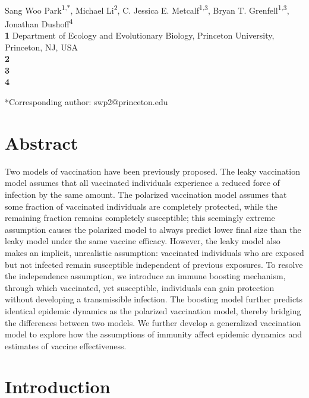 \documentclass[12pt]{article}
\date{\today}
\begin{document}
\begin{flushleft}{
	\Large
	\textbf{}
}
\newline
\\
Sang Woo Park\textsuperscript{1,*}, Michael Li\textsuperscript{2}, C. Jessica E. Metcalf\textsuperscript{1,3}, Bryan T. Grenfell\textsuperscript{1,3}, Jonathan Dushoff\textsuperscript{4}
\\
\bigskip
\textbf{1} Department of Ecology and Evolutionary Biology, Princeton University, Princeton, NJ, USA\\
\textbf{2}\\
\textbf{3}\\
\textbf{4}
\\
\bigskip

*Corresponding author: swp2@princeton.edu
\end{flushleft}

\section*{Abstract}

Two models of vaccination have been previously proposed.
The leaky vaccination model assumes that all vaccinated individuals experience a reduced force of infection by the same amount.
The polarized vaccination model assumes that some fraction of vaccinated individuals are completely protected, while the remaining fraction remains completely susceptible;
this seemingly extreme assumption causes the polarized model to always predict lower final size than the leaky model under the same vaccine efficacy.
However, the leaky model also makes an implicit, unrealistic assumption: 
vaccinated individuals who are exposed but not infected remain susceptible independent of previous exposures.
To resolve the independence assumption, we introduce an immune boosting mechanism, through which vaccinated, yet susceptible, individuals can gain protection without developing a transmissible infection.
The boosting model further predicts identical epidemic dynamics as the polarized vaccination model, thereby bridging the differences between two models.
We further develop a generalized vaccination model to explore how the assumptions of immunity affect epidemic dynamics and estimates of vaccine effectiveness.

\pagebreak

\section*{Introduction}
\end{document}
